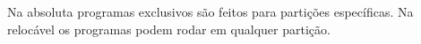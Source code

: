 
Na absoluta programas exclusivos são feitos para partições específicas.  
Na relocável os programas podem rodar em qualquer partição.



